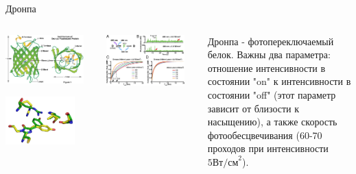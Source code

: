 \documentclass[9pt, compress, xcolor=table]{beamer}
\begin{document}
\begin{frame}{Дронпа}
\begin{columns}[c]
\column{6.5cm}
\begin{center}
\includegraphics[width=0.9\textwidth]{nlsim5}

\includegraphics[width=0.8\textwidth]{nlsim4}
\end{center}
\column{6.5cm}
\begin{center}
\includegraphics[width=0.9\textwidth]{nlsim6}
\end{center}

{\small Дронпа - фотопереключаемый белок. Важны два параметра: отношение интенсивности в состоянии "on" к интенсивности в состоянии "off" (этот параметр зависит от близости к насыщению), а также скорость фотообесцвечивания (60-70 проходов при интенсивности $5 \text{Вт/см}^2$).}

\end{columns}

\end{frame}
\end{document}
